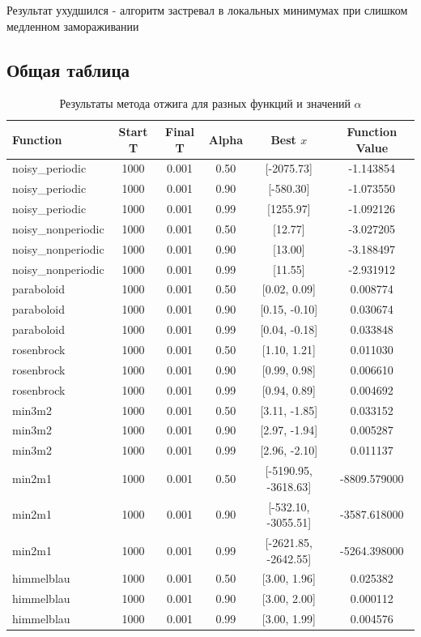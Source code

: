\documentclass{article}
\begin{document}
Результат ухудшился - алгоритм застревал в локальных минимумах при слишком медленном замораживании

\subsection{Общая таблица}

\begin{table}[H]
\centering
\begin{tabular}{|l|c|c|c|c|c|}
\hline
\textbf{Function} & \textbf{Start T} & \textbf{Final T} & \textbf{Alpha} & \textbf{Best $x$} & \textbf{Function Value} \\
\hline
noisy\_periodic & 1000 & 0.001 & 0.50 & [-2075.73] & -1.143854 \\
noisy\_periodic & 1000 & 0.001 & 0.90 & [-580.30] & -1.073550 \\
noisy\_periodic & 1000 & 0.001 & 0.99 & [1255.97] & -1.092126 \\
noisy\_nonperiodic & 1000 & 0.001 & 0.50 & [12.77] & -3.027205 \\
noisy\_nonperiodic & 1000 & 0.001 & 0.90 & [13.00] & -3.188497 \\
noisy\_nonperiodic & 1000 & 0.001 & 0.99 & [11.55] & -2.931912 \\
paraboloid & 1000 & 0.001 & 0.50 & [0.02, 0.09] & 0.008774 \\
paraboloid & 1000 & 0.001 & 0.90 & [0.15, -0.10] & 0.030674 \\
paraboloid & 1000 & 0.001 & 0.99 & [0.04, -0.18] & 0.033848 \\
rosenbrock & 1000 & 0.001 & 0.50 & [1.10, 1.21] & 0.011030 \\
rosenbrock & 1000 & 0.001 & 0.90 & [0.99, 0.98] & 0.006610 \\
rosenbrock & 1000 & 0.001 & 0.99 & [0.94, 0.89] & 0.004692 \\
min3m2 & 1000 & 0.001 & 0.50 & [3.11, -1.85] & 0.033152 \\
min3m2 & 1000 & 0.001 & 0.90 & [2.97, -1.94] & 0.005287 \\
min3m2 & 1000 & 0.001 & 0.99 & [2.96, -2.10] & 0.011137 \\
min2m1 & 1000 & 0.001 & 0.50 & [-5190.95, -3618.63] & -8809.579000 \\
min2m1 & 1000 & 0.001 & 0.90 & [-532.10, -3055.51] & -3587.618000 \\
min2m1 & 1000 & 0.001 & 0.99 & [-2621.85, -2642.55] & -5264.398000 \\
himmelblau & 1000 & 0.001 & 0.50 & [3.00, 1.96] & 0.025382 \\
himmelblau & 1000 & 0.001 & 0.90 & [3.00, 2.00] & 0.000112 \\
himmelblau & 1000 & 0.001 & 0.99 & [3.00, 1.99] & 0.004576 \\
\hline
\end{tabular}
\caption{Результаты метода отжига для разных функций и значений $\alpha$}
\end{table}
\end{document}
